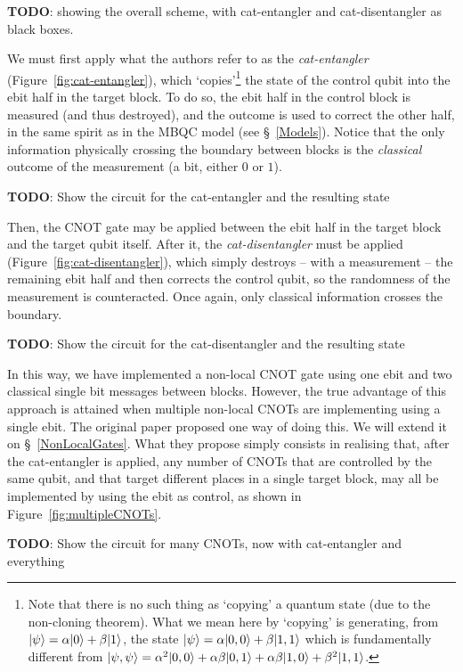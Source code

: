 \textbf{TODO}: showing the overall scheme, with cat-entangler and cat-disentangler as black boxes.

We must first apply what the authors refer to as the \textit{cat-entangler} (Figure~\ref{fig:cat-entangler}), which `copies'\footnote{Note that there is no such thing as `copying' a quantum state (due to the non-cloning theorem). What we mean here by `copying' is generating, from \(\vert \psi \rangle = \alpha\vert 0 \rangle + \beta\vert 1 \rangle\), the state \(\vert \psi \rangle = \alpha\vert 0,0 \rangle + \beta\vert 1,1 \rangle\) which is fundamentally different from \(\vert \psi,\psi \rangle = \alpha^2\vert 0,0 \rangle + \alpha\beta\vert 0,1 \rangle + \alpha\beta\vert 1,0 \rangle + \beta^2\vert 1,1 \rangle\).} the state of the control qubit into the ebit half in the target block. To do so, the ebit half in the control block is measured (and thus destroyed), and the outcome is used to correct the other half, in the same spirit as in the MBQC model (see \S~\ref{Models}). Notice that the only information physically crossing the boundary between blocks is the \textit{classical} outcome of the measurement (a bit, either \(0\) or \(1\)).

\textbf{TODO}: Show the circuit for the cat-entangler and the resulting state

Then, the CNOT gate may be applied between the ebit half in the target block and the target qubit itself. After it, the \textit{cat-disentangler} must be applied (Figure~\ref{fig:cat-disentangler}), which simply destroys -- with a measurement -- the remaining ebit half and then corrects the control qubit, so the randomness of the measurement is counteracted. Once again, only classical information crosses the boundary.

\textbf{TODO}: Show the circuit for the cat-disentangler and the resulting state

In this way, we have implemented a non-local CNOT gate using one ebit and two classical single bit messages between blocks. However, the true advantage of this approach is attained when multiple non-local CNOTs are implementing using a single ebit. The original paper \citep{NonLocalCNOT} proposed one way of doing this. We will extend it on \S~\ref{NonLocalGates}. What they propose simply consists in realising that, after the cat-entangler is applied, any number of CNOTs that are controlled by the same qubit, and that target different places in a single target block, may all be implemented by using the ebit as control, as shown in Figure~\ref{fig:multipleCNOTs}.

\textbf{TODO}: Show the circuit for many CNOTs, now with cat-entangler and everything

